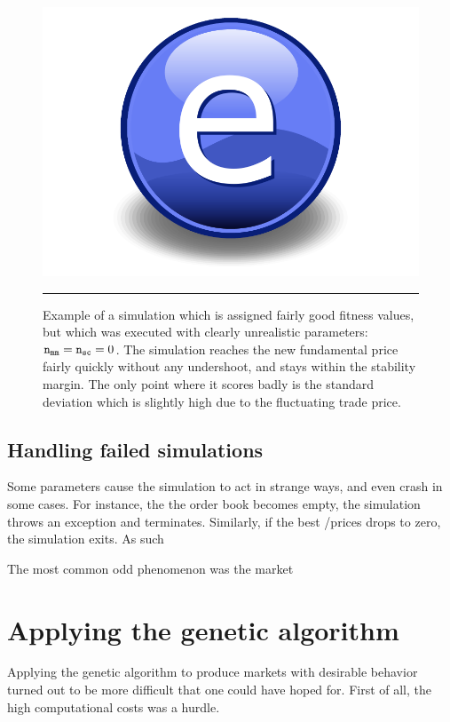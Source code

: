 \begin{figure}[htbp]
	\centering
		\includegraphics{Figures/Electron.pdf}
		\rule{35em}{0.5pt}
	\caption{Example of a simulation which is assigned fairly good fitness values, but which was executed with clearly unrealistic parameters: $ \texttt{n}_\texttt{mm}  =  \texttt{n}_\texttt{sc}  = 0$. The simulation reaches the new fundamental price fairly quickly without any undershoot, and stays within the stability margin. The only point where it scores badly is the standard deviation which is slightly high due to the fluctuating trade price.}
	\label{fig:no_marketmakers}
\end{figure}


\subsection{Handling failed simulations}\label{section:failed_simulations}


Some parameters cause the simulation to act in strange ways, and even crash in some cases. For instance, the the order book becomes empty, the simulation throws an exception and terminates. Similarly, if the best \bid/\ask prices drops to zero, the simulation exits. As such 

The most common odd phenomenon was the market 


\section{Applying the genetic algorithm}
Applying the genetic algorithm to produce markets with desirable behavior turned out to be more difficult that one could have hoped for. First of all, the high computational costs was a hurdle. 

